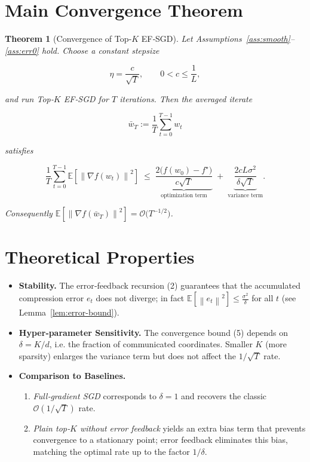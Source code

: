 \documentclass[11pt]{article}
\newtheorem{theorem}{Theorem}
\newcommand{\E}{\mathbb{E}}
\newcommand{\norm}[1]{\left\|#1\right\|}
\newcommand{\grad}{\nabla}
\begin{document}
\section*{Main Convergence Theorem}
\begin{theorem}[Convergence of Top‑$K$ EF‑SGD]\label{thm:main}
Let Assumptions~\ref{ass:smooth}–\ref{ass:err0} hold. Choose a constant stepsize  

\[
\eta = \frac{c}{\sqrt{T}},\qquad 0<c\le\frac{1}{L},
\]

and run Top‑$K$ EF‑SGD for $T$ iterations. Then the averaged iterate  

\[
\bar w_T:=\frac1T\sum_{t=0}^{T-1} w_t
\]

satisfies  

\[
\frac{1}{T}\sum_{t=0}^{T-1}\E\!\left[\norm{\grad f(w_t)}^{2}\right]
\;\le\;
\underbrace{\frac{2\bigl(f(w_0)-f^{\star}\bigr)}{c\sqrt{T}}}_{\text{optimization term}}
\;+\;
\underbrace{\frac{2cL\sigma^{2}}{\delta\sqrt{T}}}_{\text{variance term}}.
\tag{5}
\]

Consequently $\E[\norm{\grad f(\bar w_T)}^{2}]=\mathcal O\!\bigl(T^{-1/2}\bigr)$.
\end{theorem}

\section*{Theoretical Properties}
\begin{itemize}
\item \textbf{Stability.} The error‑feedback recursion (2) guarantees that the accumulated compression error $e_t$ does not diverge; in fact $\E[\norm{e_t}^{2}]\le \frac{\sigma^{2}}{\delta}$ for all $t$ (see Lemma~\ref{lem:error-bound}).
\item \textbf{Hyper‑parameter Sensitivity.} The convergence bound (5) depends on $\delta=K/d$, i.e. the fraction of communicated coordinates. Smaller $K$ (more sparsity) enlarges the variance term but does not affect the $1/\sqrt{T}$ rate.
\item \textbf{Comparison to Baselines.}
    \begin{enumerate}
        \item \emph{Full‑gradient SGD} corresponds to $\delta=1$ and recovers the classic $\mathcal O(1/\sqrt{T})$ rate.
        \item \emph{Plain top‑$K$ without error feedback} yields an extra bias term that prevents convergence to a stationary point; error feedback eliminates this bias, matching the optimal rate up to the factor $1/\delta$.
    \end{enumerate}
\end{itemize}
\end{document}
